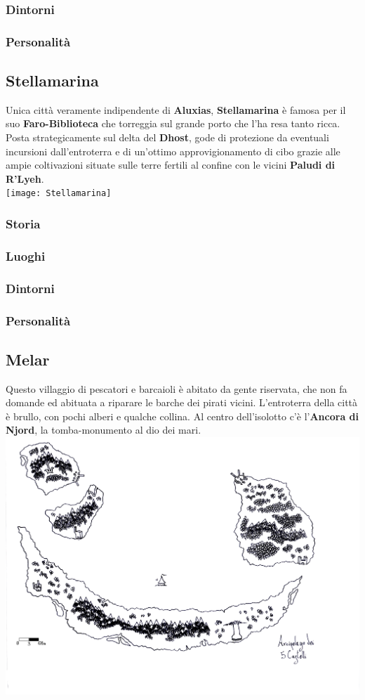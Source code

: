 \documentclass[10pt,twoside,onecolumn,openany]{book}
\begin{document}
\subsubsection{Dintorni}
\subsubsection{Personalità}
\newpage
\subsection{Stellamarina}
Unica città veramente indipendente di \textbf{Aluxias}, \textbf{Stellamarina} è famosa per il suo \textbf{Faro-Biblioteca} che torreggia sul grande porto che l'ha resa tanto ricca.\\
Posta strategicamente sul delta del \textbf{Dhost}, gode di protezione da eventuali incursioni dall'entroterra e di un'ottimo approvigionamento di cibo grazie alle ampie coltivazioni situate sulle terre fertili al confine con le vicini \textbf{Paludi di R'Lyeh}.\\
\texttt{[image: Stellamarina]}
\subsubsection{Storia}
\subsubsection{Luoghi}
\subsubsection{Dintorni}
\subsubsection{Personalità}
\newpage
\subsection{Melar}
Questo villaggio di pescatori e barcaioli è abitato da gente riservata, che non fa domande ed abituata a riparare le barche dei pirati vicini. L'entroterra della città è brullo, con pochi alberi e qualche collina. Al centro dell'isolotto c'è l'\textbf{Ancora di Njord}, la tomba-monumento al dio dei mari.\\
\includegraphics[scale=0.75]{arccinqcastelli}
\end{document}
